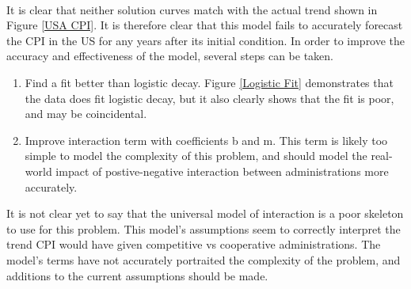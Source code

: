 \documentclass{article}
\begin{document}
	\paragraph{}
	It is clear that neither solution curves match with the actual trend shown in Figure \ref{USA CPI}. It is therefore clear that this model fails to accurately forecast the CPI in the US for any years after its initial condition. In order to improve the accuracy and effectiveness of the model, several steps can be taken.
	\begin{enumerate}
	\item Find a fit better than logistic decay. Figure \ref{Logistic Fit} demonstrates that the data does fit logistic decay, but it also clearly shows that the fit is poor, and may be coincidental.
	\item Improve interaction term with coefficients b and m. This term is likely too simple to model the complexity of this problem, and should model the real-world impact of postive-negative interaction between administrations more accurately.
	\end{enumerate}
	It is not clear yet to say that the universal model of interaction is a poor skeleton to use for this problem. This model's assumptions seem to correctly interpret the trend CPI would have given competitive vs cooperative administrations. The model's terms have not accurately portraited the complexity of the problem, and additions to the current assumptions should be made.
\end{document}
